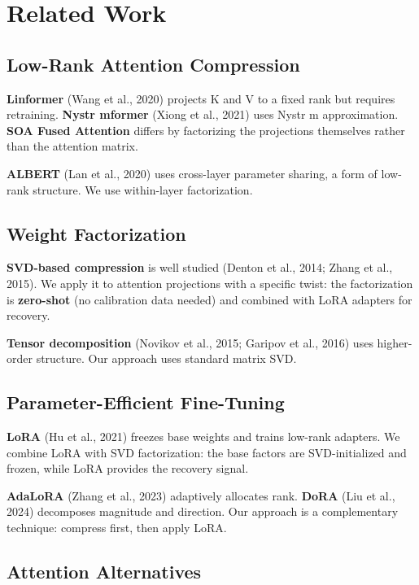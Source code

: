 \section{Related Work}

\subsection{Low-Rank Attention Compression}

\textbf{Linformer} (Wang et al., 2020) projects K and V to a fixed rank but requires 
retraining. \textbf{Nystr mformer} (Xiong et al., 2021) uses Nystr m approximation. 
\textbf{SOA Fused Attention} differs by factorizing the projections themselves 
rather than the attention matrix.

\textbf{ALBERT} (Lan et al., 2020) uses cross-layer parameter sharing, a form of 
low-rank structure. We use within-layer factorization.

\subsection{Weight Factorization}

\textbf{SVD-based compression} is well studied (Denton et al., 2014; Zhang et al., 
2015). We apply it to attention projections with a specific twist: the 
factorization is \textbf{zero-shot} (no calibration data needed) and combined 
with LoRA adapters for recovery.

\textbf{Tensor decomposition} (Novikov et al., 2015; Garipov et al., 2016) uses 
higher-order structure. Our approach uses standard matrix SVD.

\subsection{Parameter-Efficient Fine-Tuning}

\textbf{LoRA} (Hu et al., 2021) freezes base weights and trains low-rank adapters. 
We combine LoRA with SVD factorization: the base factors are SVD-initialized 
and frozen, while LoRA provides the recovery signal.

\textbf{AdaLoRA} (Zhang et al., 2023) adaptively allocates rank. \textbf{DoRA} 
(Liu et al., 2024) decomposes magnitude and direction. Our approach is a 
complementary technique: compress first, then apply LoRA.

\subsection{Attention Alternatives}


